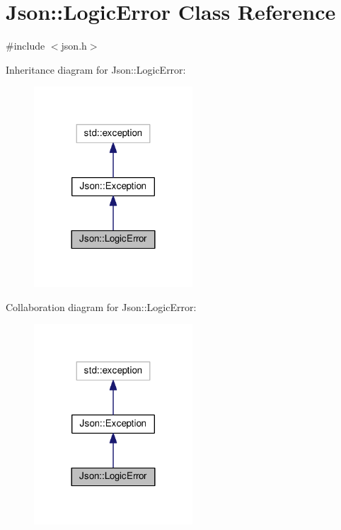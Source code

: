 \hypertarget{class_json_1_1_logic_error}{}\section{Json\+:\+:Logic\+Error Class Reference}
\label{class_json_1_1_logic_error}


{\ttfamily \#include $<$json.\+h$>$}



Inheritance diagram for Json\+:\+:Logic\+Error\+:
\nopagebreak
\begin{figure}[H]
\begin{center}
\leavevmode
\includegraphics[width=168pt]{class_json_1_1_logic_error__inherit__graph}
\end{center}
\end{figure}


Collaboration diagram for Json\+:\+:Logic\+Error\+:
\nopagebreak
\begin{figure}[H]
\begin{center}
\leavevmode
\includegraphics[width=168pt]{class_json_1_1_logic_error__coll__graph}
\end{center}
\end{figure}
